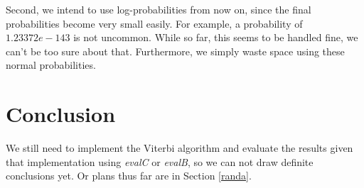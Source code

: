 \documentclass[11pt,twocolumn]{article}
\begin{document}
Second, we intend to use log-probabilities from now on, since the final probabilities  become very small easily. For example, a probability of $1.23372e-143$ is not uncommon. While so far, this seems to be handled fine, we can't be too sure about that. Furthermore, we simply waste space using these normal probabilities.


\section{Conclusion}

We still need to implement the Viterbi algorithm and evaluate the results given that implementation using \emph{evalC} or \emph{evalB}, so we can not draw definite conclusions yet. Or plans thus far are in Section \ref{randa}.              

\nocite{*}


\end{document}
